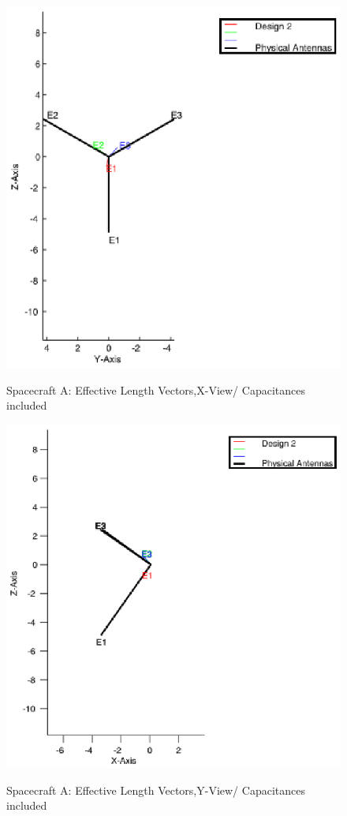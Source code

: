\documentclass[a4paper,10pt]{thesis}
\begin{document}
\begin{figure}
  \begin{center}
    \includegraphics[width=12cm]{HeffD2HGA0-500kHz-XViewCap.eps}\\
    \caption{Spacecraft A: Effective Length Vectors,X-View/ Capacitances included}\label{fig_Heff_D2_A_X_ViewCap}
  \end{center}
\end{figure}


\begin{figure}
 \begin{center}
 \includegraphics[width=12cm]{HeffD2HGA0-500kHz-YViewCap.eps}\\
    \caption{Spacecraft A: Effective Length Vectors,Y-View/ Capacitances included}\label{fig_Heff_D2_A_Y_ViewCap}\end{center}
\end{figure}
\end{document}
